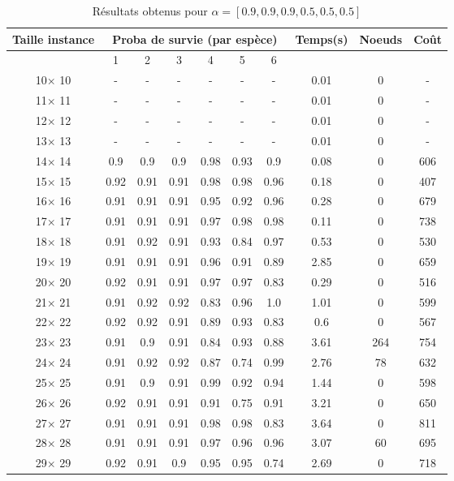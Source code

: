 \documentclass[main.tex]{subfiles}
\begin{document}
\begin{table}
    \centering
    \caption{Résultats obtenus pour $\alpha = [0.9, 0.9, 0.9, 0.5, 0.5, 0.5]$}
    \begin{tabular}{|c|c|c|c|c|c|c|c|c|c|}
	\hline
	\textbf{Taille instance} &\multicolumn{6}{c}{\textbf{Proba de survie (par espèce)}} &\textbf{Temps(s)} &\textbf{Noeuds} &\textbf{Coût}\\
	\hline
	 &1 &2 &3 &4 &5 &6 & & &\\
	\hline

10$\times$ 10 & -  & -  & -  & -  & -  & -  &0.01 &0 & - \\
11$\times$ 11 & -  & -  & -  & -  & -  & -  &0.01 &0 & - \\
12$\times$ 12 & -  & -  & -  & -  & -  & -  &0.01 &0 & - \\
13$\times$ 13 & -  & -  & -  & -  & -  & -  &0.01 &0 & - \\
14$\times$ 14 &0.9 &0.9 &0.9 &0.98 &0.93 &0.9 &0.08 &0 &606\\
15$\times$ 15 &0.92 &0.91 &0.91 &0.98 &0.98 &0.96 &0.18 &0 &407\\
16$\times$ 16 &0.91 &0.91 &0.91 &0.95 &0.92 &0.96 &0.28 &0 &679\\
17$\times$ 17 &0.91 &0.91 &0.91 &0.97 &0.98 &0.98 &0.11 &0 &738\\
18$\times$ 18 &0.91 &0.92 &0.91 &0.93 &0.84 &0.97 &0.53 &0 &530\\
19$\times$ 19 &0.91 &0.91 &0.91 &0.96 &0.91 &0.89 &2.85 &0 &659\\
20$\times$ 20 &0.92 &0.91 &0.91 &0.97 &0.97 &0.83 &0.29 &0 &516\\
21$\times$ 21 &0.91 &0.92 &0.92 &0.83 &0.96 &1.0 &1.01 &0 &599\\
22$\times$ 22 &0.92 &0.92 &0.91 &0.89 &0.93 &0.83 &0.6 &0 &567\\
23$\times$ 23 &0.91 &0.9 &0.91 &0.84 &0.93 &0.88 &3.61 &264 &754\\
24$\times$ 24 &0.91 &0.92 &0.92 &0.87 &0.74 &0.99 &2.76 &78 &632\\
25$\times$ 25 &0.91 &0.9 &0.91 &0.99 &0.92 &0.94 &1.44 &0 &598\\
26$\times$ 26 &0.92 &0.91 &0.91 &0.91 &0.75 &0.91 &3.21 &0 &650\\
27$\times$ 27 &0.91 &0.91 &0.91 &0.98 &0.98 &0.83 &3.64 &0 &811\\
28$\times$ 28 &0.91 &0.91 &0.91 &0.97 &0.96 &0.96 &3.07 &60 &695\\
29$\times$ 29 &0.92 &0.91 &0.9 &0.95 &0.95 &0.74 &2.69 &0 &718\\

\end{tabular}
\end{table}
\end{document}
